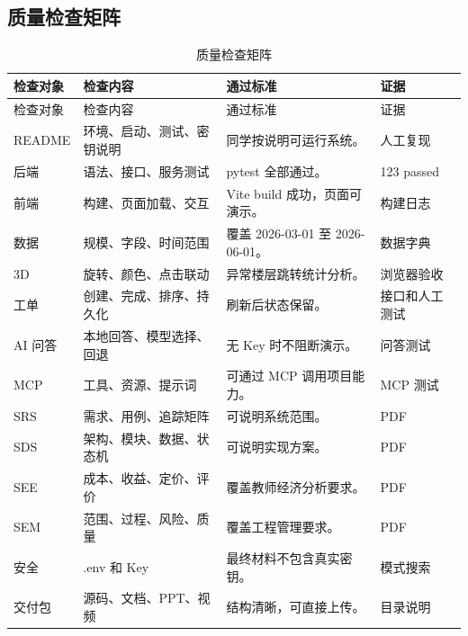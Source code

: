 \documentclass[12pt,a4paper]{ctexart}
\begin{document}
\subsection{质量检查矩阵}
\begin{longtable}{L{2.4cm}L{4.0cm}L{4.5cm}L{3.5cm}}
\caption{质量检查矩阵}\\
\toprule
检查对象 & 检查内容 & 通过标准 & 证据 \\
\midrule
\endfirsthead
\toprule
检查对象 & 检查内容 & 通过标准 & 证据 \\
\midrule
\endhead
README & 环境、启动、测试、密钥说明 & 同学按说明可运行系统。 & 人工复现 \\
后端 & 语法、接口、服务测试 & pytest 全部通过。 & 123 passed \\
前端 & 构建、页面加载、交互 & Vite build 成功，页面可演示。 & 构建日志 \\
数据 & 规模、字段、时间范围 & 覆盖 2026-03-01 至 2026-06-01。 & 数据字典 \\
3D & 旋转、颜色、点击联动 & 异常楼层跳转统计分析。 & 浏览器验收 \\
工单 & 创建、完成、排序、持久化 & 刷新后状态保留。 & 接口和人工测试 \\
AI 问答 & 本地回答、模型选择、回退 & 无 Key 时不阻断演示。 & 问答测试 \\
MCP & 工具、资源、提示词 & 可通过 MCP 调用项目能力。 & MCP 测试 \\
SRS & 需求、用例、追踪矩阵 & 可说明系统范围。 & PDF \\
SDS & 架构、模块、数据、状态机 & 可说明实现方案。 & PDF \\
SEE & 成本、收益、定价、评价 & 覆盖教师经济分析要求。 & PDF \\
SEM & 范围、过程、风险、质量 & 覆盖工程管理要求。 & PDF \\
安全 & .env 和 Key & 最终材料不包含真实密钥。 & 模式搜索 \\
交付包 & 源码、文档、PPT、视频 & 结构清晰，可直接上传。 & 目录说明 \\
\bottomrule
\end{longtable}
\end{document}
